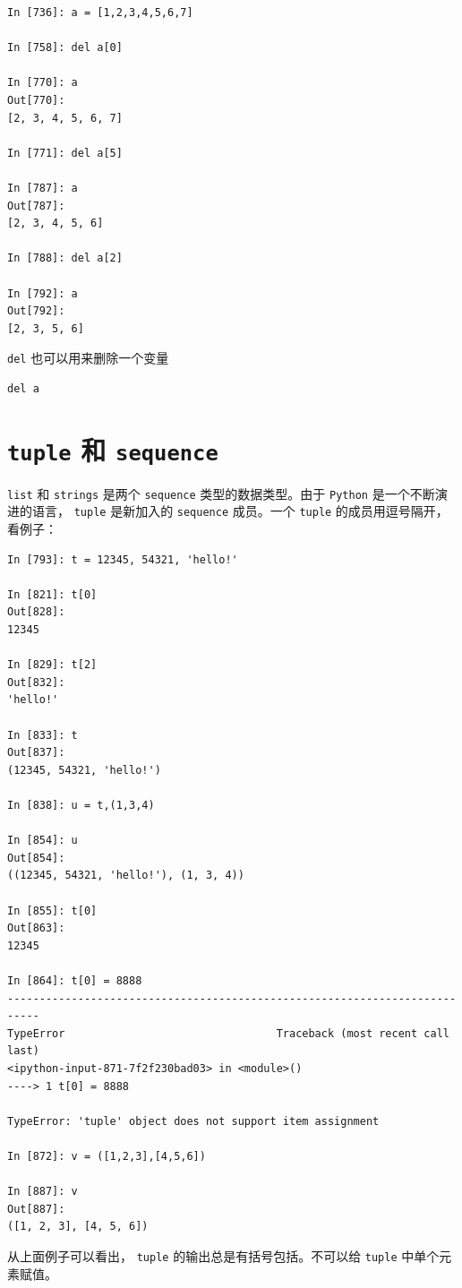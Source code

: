 \documentclass[10pt,a4paper,UTF8]{article}
\begin{document}
\begin{verbatim}
In [736]: a = [1,2,3,4,5,6,7]

In [758]: del a[0]

In [770]: a
Out[770]: 
[2, 3, 4, 5, 6, 7]

In [771]: del a[5]

In [787]: a
Out[787]: 
[2, 3, 4, 5, 6]

In [788]: del a[2]

In [792]: a
Out[792]: 
[2, 3, 5, 6]
\end{verbatim}

\texttt{del} 也可以用来删除一个变量
\begin{verbatim}
del a
\end{verbatim}

\section{\texttt{tuple} 和 \texttt{sequence}}
\label{sec:orgb4afeaf}


\texttt{list} 和 \texttt{strings} 是两个 \texttt{sequence} 类型的数据类型。由于 \texttt{Python} 是一个不断演进的语言， \texttt{tuple} 是新加入的 \texttt{sequence} 成员。一个 \texttt{tuple} 的成员用逗号隔开，看例子：
\begin{verbatim}
In [793]: t = 12345, 54321, 'hello!'

In [821]: t[0]
Out[828]: 
12345

In [829]: t[2]
Out[832]: 
'hello!'

In [833]: t
Out[837]: 
(12345, 54321, 'hello!')

In [838]: u = t,(1,3,4)

In [854]: u
Out[854]: 
((12345, 54321, 'hello!'), (1, 3, 4))

In [855]: t[0]
Out[863]: 
12345

In [864]: t[0] = 8888
---------------------------------------------------------------------------
TypeError                                 Traceback (most recent call last)
<ipython-input-871-7f2f230bad03> in <module>()
----> 1 t[0] = 8888

TypeError: 'tuple' object does not support item assignment

In [872]: v = ([1,2,3],[4,5,6])

In [887]: v
Out[887]: 
([1, 2, 3], [4, 5, 6])
\end{verbatim}

从上面例子可以看出， \texttt{tuple} 的输出总是有括号包括。不可以给 \texttt{tuple} 中单个元素赋值。
\end{document}
